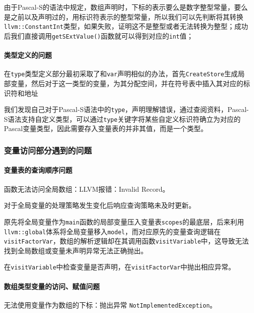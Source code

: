 \documentclass[lang=cn,11pt,a4paper,cite=authornum]{paper}
\begin{document}
由于Pascal-S的语法中规定，数组声明时，下标的表示要么是数字整型常量，要么是之前以及声明过的，用标识符表示的整型常量，所以我们可以先判断将其转换\texttt{llvm::ConstantInt}类型，如果失败，证明这不是整型或者无法转换为整型；成功后我们直接调用\texttt{getSExtValue()}函数就可以得到对应的\texttt{int}值；

\paragraph{类型定义的问题}

在\texttt{type}类型定义部分最初采取了和\texttt{var}声明相似的办法，首先\texttt{CreateStore}生成局部变量，然后对于这一类型的变量，为其分配空间，并在符号表中插入其对应的标识符和地址

我们发现自己对于Pascal-S语法中的\texttt{type}，声明理解错误，通过查阅资料，Pascal-S语法支持自定义类型，可以通过\texttt{type}关键字将某些自定义标识符确立为对应的Pascal变量类型，因此需要存入变量表的并非其值，而是一个类型。

\subsubsection{变量访问部分遇到的问题}

\paragraph{变量表的查询顺序问题}

函数无法访问全局数组：LLVM报错：Invalid Record。

对于全局变量的处理策略发生变化后响应查询策略未及时更新。

原先将全局变量作为\texttt{main}函数的局部变量压入变量表\texttt{scopes}的最底层，后来利用 \texttt{llvm::global}体系将全局变量移入\texttt{model}，而对应原先的变量查询逻辑在\texttt{visitFactorVar}，数组的解析逻辑却在其调用函数\texttt{visitVariable}中，这导致无法找到全局数组或变量未声明异常无法正确抛出。

在\texttt{visitVariable}中检查变量是否声明，在\texttt{visitFactorVar}中抛出相应异常。

\paragraph{数组类型变量的访问、赋值问题}

无法使用变量作为数组的下标：抛出异常 \texttt{NotImplementedException}。
\end{document}
